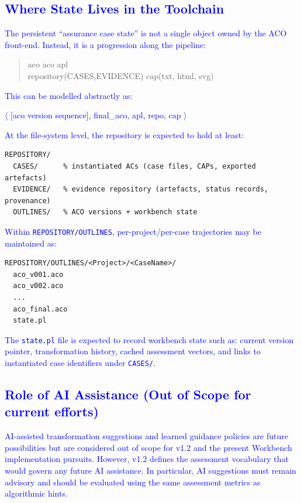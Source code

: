 \documentclass[11pt,twoside,a4paper]{article}
\newcommand{\pipeline}{\textrightarrow}
\begin{document}
\subsection{\textcolor{blue}{Where State Lives in the Toolchain}}

\textcolor{blue}{The persistent ``assurance case state'' is not a single object owned by the ACO front-end. Instead, it is a progression along the pipeline:}

\begin{quote}\ttfamily\small\raggedright
aco \pipeline [ACO-WORKBENCH] \pipeline aco \pipeline [ACO-to-APL] \pipeline apl \pipeline [INSTANTIATE]\\
\pipeline repository(CASES,EVIDENCE) \pipeline [EXPORT\_AC] \pipeline cap(txt, html, svg)
\end{quote}

\textcolor{blue}{This can be modelled abstractly as:}
\begin{center}
\textcolor{blue}{$\langle$ [aco version sequence], final\_aco, apl, repo, cap $\rangle$}
\end{center}

\textcolor{blue}{At the file-system level, the repository is expected to hold at least:}
\begin{verbatim}
REPOSITORY/
  CASES/      % instantiated ACs (case files, CAPs, exported artefacts)
  EVIDENCE/   % evidence repository (artefacts, status records, provenance)
  OUTLINES/   % ACO versions + workbench state
\end{verbatim}

\textcolor{blue}{Within \texttt{REPOSITORY/OUTLINES}, per-project/per-case trajectories may be maintained as:}
\begin{verbatim}
REPOSITORY/OUTLINES/<Project>/<CaseName>/
  aco_v001.aco
  aco_v002.aco
  ...
  aco_final.aco
  state.pl
\end{verbatim}

\textcolor{blue}{The \texttt{state.pl} file is expected to record workbench state such as: current version pointer, transformation history, cached assessment vectors, and links to instantiated case identifiers under \texttt{CASES/}.}

\subsection{\textcolor{blue}{Role of AI Assistance (Out of Scope for current efforts)}}

\textcolor{blue}{AI-assisted transformation suggestions and learned guidance policies are future possibilities but are considered out of scope for v1.2 and the present Workbench implementation pursuits. However, v1.2 defines the assessment vocabulary that would govern any future AI assistance. In particular, AI suggestions must remain advisory and should be evaluated using the same assessment metrics as algorithmic hints.}
\end{document}
